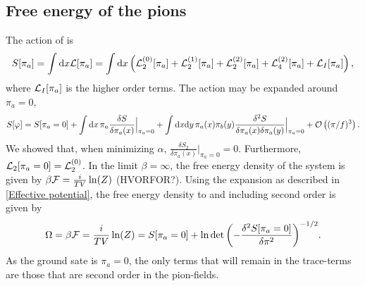 \subsection{Free energy of the pions}
The action of \chpt is 
\begin{equation}
    S[\pi_a] =\int \dd x \Ell[\pi_a]
    = 
    \int \dd x \left(
        \Ell^{(0)}_2[\pi_a] +\Ell^{(1)}_2[\pi_a] + \Ell^{(2)}_2[\pi_a] + \Ell^{(2)}_4[\pi_a] 
        + \Ell_I[\pi_a] 
        \right),
\end{equation}
where $\Ell_I[\pi_a] $ is the higher order terms.
The action may be expanded around $\pi_a = 0$,
\begin{equation}
    S[\varphi]
    = 
    S[\pi_a = 0] 
    + \int \dd x \, \pi_a  \frac{\delta S}{\delta \pi_a(x)}\Big|_{\pi_a=0}
    + \int \dd x \dd y \, \pi_a(x) \pi_b(y)
    \frac{\delta^2 S}{\delta \pi_a(x) \delta \pi_a(y)}\Big|_{\pi_a=0}
    + \Oh[3]{(\pi/f)}.
\end{equation}
We showed that, when minimizing $\alpha$, $\frac{\delta S_2}{\delta \pi_a(x)}\Big|_{\pi_a=0} = 0$. 
Furthermore, $\Ell_2[\pi_a = 0] = \Ell_2^{(0)}$. 
In the limit $\beta = \infty$, the free energy density of the system is given by $ \beta \Ef
= \frac{i}{T V} \ln(Z)$ (HVORFOR?). 
Using the expansion as described in \autoref{Effective potential}, the free energy density to and including second order is given by 
\begin{equation}
    \label{Free energy to second order}
    \Omega = 
    \beta \Ef
    = \frac{i}{T V} \ln(Z)
    = S[\pi_a = 0]
    +\ln{\det\left( - \frac{\delta^2 S[\pi_a=0]}{\delta \pi^2} \right)}^{-1/2}.
\end{equation}
As the ground sate is $\pi_a = 0$, the only terms that will remain in the trace-terms are those that are second order in the pion-fields.
